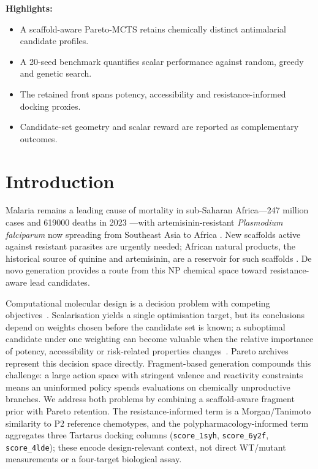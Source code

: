 \documentclass[10pt,a4paper]{article}
\begin{document}
\noindent\textbf{Highlights:}
\begin{itemize}
\item A scaffold-aware Pareto-MCTS retains chemically distinct antimalarial candidate profiles.
\item A \num{20}-seed benchmark quantifies scalar performance against random, greedy and genetic search.
\item The retained front spans potency, accessibility and resistance-informed docking proxies.
\item Candidate-set geometry and scalar reward are reported as complementary outcomes.
\end{itemize}

\section{Introduction}

Malaria remains a leading cause of mortality in sub-Saharan Africa---\num{247} million cases and \num{619000} deaths in 2023 \citep{WHO2024MalariaReport}---with artemisinin-resistant \emph{Plasmodium falciparum} now spreading from Southeast Asia to Africa \citep{Ariey2014,Ashley2018}. New scaffolds active against resistant parasites are urgently needed; African natural products, the historical source of quinine and artemisinin, are a reservoir for such scaffolds \citep{Temgoua2026a}. De novo generation provides a route from this NP chemical space toward resistance-aware lead candidates.

Computational molecular design is a decision problem with competing objectives~\citep{GDPLarge2019,Olivecrona2017}. Scalarisation yields a single optimisation target, but its conclusions depend on weights chosen before the candidate set is known; a suboptimal candidate under one weighting can become valuable when the relative importance of potency, accessibility or risk-related properties changes~\citep{Mothra2024,Zitzler2003}. Pareto archives represent this decision space directly. Fragment-based generation compounds this challenge: a large action space with stringent valence and reactivity constraints means an uninformed policy spends evaluations on chemically unproductive branches. We address both problems by combining a scaffold-aware fragment prior with Pareto retention. The resistance-informed term is a Morgan/Tanimoto similarity to P2 reference chemotypes, and the polypharmacology-informed term aggregates three Tartarus docking columns (\texttt{score\_1syh}, \texttt{score\_6y2f}, \texttt{score\_4lde}); these encode design-relevant context, not direct WT/mutant measurements or a four-target biological assay.
\end{document}
